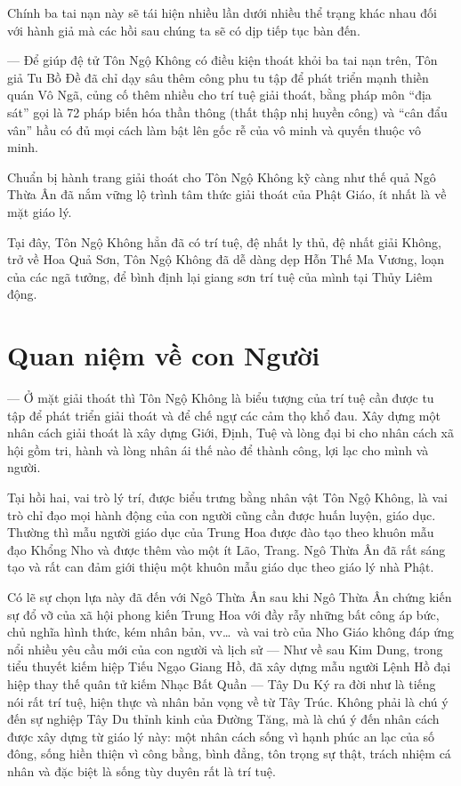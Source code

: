 Chính ba tai nạn này sẽ tái hiện nhiều lần dưới nhiều thể trạng khác nhau đối với hành giả mà các hồi sau chúng ta sẽ có dịp tiếp tục bàn đến.

— Để giúp đệ tử Tôn Ngộ Không có điều kiện thoát khỏi ba tai nạn trên, Tôn giả Tu Bồ Đề đã chỉ dạy sâu thêm công phu tu tập để phát triển mạnh thiền quán Vô Ngã, củng cố thêm nhiều cho trí tuệ giải thoát, bằng pháp môn ``địa sát'' gọi là 72 pháp biến hóa thần thông (thất thập nhị huyền công) và ``cân đẩu vân'' hầu có đủ mọi cách làm bật lên gốc rễ của vô minh và quyến thuộc vô minh.

Chuẩn bị hành trang giải thoát cho Tôn Ngộ Không kỹ càng như thế quả Ngô Thừa Ân đã nắm vững lộ trình tâm thức giải thoát của Phật Giáo, ít nhất là về mặt giáo lý.

Tại đây, Tôn Ngộ Không hẳn đã có trí tuệ, đệ nhất ly thủ, đệ nhất giải Không, trở về Hoa Quả Sơn, Tôn Ngộ Không đã dễ dàng dẹp Hỗn Thế Ma Vương, loạn của các ngã tưởng, để bình định lại giang sơn trí tuệ của mình tại Thủy Liêm động.

\section{Quan niệm về con Người} %
\label{sec:2_quan_niem_ve_con_nguoi}

— Ở mặt giải thoát thì Tôn Ngộ Không là biểu tượng của trí tuệ cần được tu tập để phát triển giải thoát và để chế ngự các cảm thọ khổ đau. Xây dựng một nhân cách giải thoát là xây dựng Giới, Định, Tuệ và lòng đại bi cho nhân cách xã hội gồm tri, hành và lòng nhân ái thế nào để thành công, lợi lạc cho mình và người.

Tại hồi hai, vai trò lý trí, được biểu trưng bằng nhân vật Tôn Ngộ Không, là vai trò chỉ đạo mọi hành động của con người cũng cần được huấn luyện, giáo dục. Thường thì mẫu người giáo dục của Trung Hoa được đào tạo theo khuôn mẫu đạo Khổng Nho và được thêm vào một ít Lão, Trang. Ngô Thừa Ân đã rất sáng tạo và rất can đảm giới thiệu một khuôn mẫu giáo dục theo giáo lý nhà Phật.

Có lẽ sự chọn lựa này đã đến với Ngô Thừa Ân sau khi Ngô Thừa Ân chứng kiến sự đổ vỡ của xã hội phong kiến Trung Hoa với đầy rẫy những bất công áp bức, chủ nghĩa hình thức, kém nhân bản, vv\ldots ~và vai trò của Nho Giáo không đáp ứng nổi nhiều yêu cầu mới của con người và lịch sử — Như về sau Kim Dung, trong tiểu thuyết kiếm hiệp Tiếu Ngạo Giang Hồ, đã xây dựng mẫu người Lệnh Hồ đại hiệp thay thế quân tử kiếm Nhạc Bất Quần — Tây Du Ký ra đời như là tiếng nói rất trí tuệ, hiện thực và nhân bản vọng về từ Tây Trúc. Không phải là chú ý đến sự nghiệp Tây Du thỉnh kinh của Đường Tăng, mà là chú ý đến nhân cách được xây dựng từ giáo lý này: một nhân cách sống vì hạnh phúc an lạc của số đông, sống hiền thiện vì công bằng, bình đẳng, tôn trọng sự thật, trách nhiệm cá nhân và đặc biệt là sống tùy duyên rất là trí tuệ.

